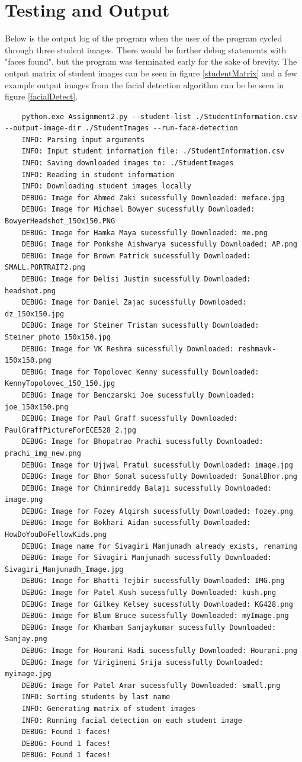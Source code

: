 \documentclass[12pt, letterpaper, final, onecolumn, titlepage] {article}
\begin{document}
\pagebreak
\section{Testing and Output}
Below is the output log of the program when the user of the program cycled through three student images. There would be further debug statements with "faces found", but the program was terminated early for the sake of brevity. The output matrix of student images can be seen in figure \ref{studentMatrix} and a few example output images from the facial detection algorithm can be be seen in figure \ref{facialDetect}.

\singlespacing
\begin{lstlisting}
	python.exe Assignment2.py --student-list ./StudentInformation.csv --output-image-dir ./StudentImages --run-face-detection
	INFO: Parsing input arguments
	INFO: Input student information file: ./StudentInformation.csv
	INFO: Saving downloaded images to: ./StudentImages
	INFO: Reading in student information
	INFO: Downloading student images locally
	DEBUG: Image for Ahmed Zaki sucessfully Downloaded: meface.jpg
	DEBUG: Image for Michael Bowyer sucessfully Downloaded: BowyerHeadshot_150x150.PNG
	DEBUG: Image for Hamka Maya sucessfully Downloaded: me.png
	DEBUG: Image for Ponkshe Aishwarya sucessfully Downloaded: AP.png
	DEBUG: Image for Brown Patrick sucessfully Downloaded: SMALL.PORTRAIT2.png
	DEBUG: Image for Delisi Justin sucessfully Downloaded: headshot.png
	DEBUG: Image for Daniel Zajac sucessfully Downloaded: dz_150x150.jpg
	DEBUG: Image for Steiner Tristan sucessfully Downloaded: Steiner_photo_150x150.jpg
	DEBUG: Image for VK Reshma sucessfully Downloaded: reshmavk-150x150.png
	DEBUG: Image for Topolovec Kenny sucessfully Downloaded: KennyTopolovec_150_150.jpg
	DEBUG: Image for Benczarski Joe sucessfully Downloaded: joe_150x150.png
	DEBUG: Image for Paul Graff sucessfully Downloaded: PaulGraffPictureForECE528_2.jpg
	DEBUG: Image for Bhopatrao Prachi sucessfully Downloaded: prachi_img_new.png
	DEBUG: Image for Ujjwal Pratul sucessfully Downloaded: image.jpg
	DEBUG: Image for Bhor Sonal sucessfully Downloaded: SonalBhor.png
	DEBUG: Image for Chinnireddy Balaji sucessfully Downloaded: image.png
	DEBUG: Image for Fozey Alqirsh sucessfully Downloaded: fozey.png
	DEBUG: Image for Bokhari Aidan sucessfully Downloaded: HowDoYouDoFellowKids.png
	DEBUG: Image name for Sivagiri Manjunadh already exists, renaming
	DEBUG: Image for Sivagiri Manjunadh sucessfully Downloaded: Sivagiri_Manjunadh_Image.jpg
	DEBUG: Image for Bhatti Tejbir sucessfully Downloaded: IMG.png
	DEBUG: Image for Patel Kush sucessfully Downloaded: kush.png
	DEBUG: Image for Gilkey Kelsey sucessfully Downloaded: KG428.png
	DEBUG: Image for Blum Bruce sucessfully Downloaded: myImage.png
	DEBUG: Image for Khambam Sanjaykumar sucessfully Downloaded: Sanjay.png
	DEBUG: Image for Hourani Hadi sucessfully Downloaded: Hourani.png
	DEBUG: Image for Virigineni Srija sucessfully Downloaded: myimage.jpg
	DEBUG: Image for Patel Amar sucessfully Downloaded: small.png
	INFO: Sorting students by last name
	INFO: Generating matrix of student images
	INFO: Running facial detection on each student image
	DEBUG: Found 1 faces!
	DEBUG: Found 1 faces!
	DEBUG: Found 1 faces!	
\end{lstlisting}
\end{document}
